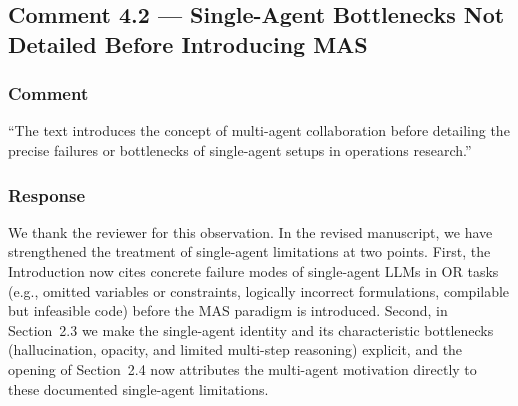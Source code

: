 \documentclass[11pt,a4paper]{article}
\begin{document}
\subsection{Comment 4.2 --- Single-Agent Bottlenecks Not Detailed Before Introducing MAS}

\subsubsection{Comment}
``The text introduces the concept of multi-agent collaboration before detailing the precise failures or bottlenecks of single-agent setups in operations research.''

\subsubsection{Response}
We thank the reviewer for this observation. In the revised manuscript, we have strengthened the treatment of single-agent limitations at two points. First, the Introduction now cites concrete failure modes of single-agent LLMs in OR tasks (e.g., omitted variables or constraints, logically incorrect formulations, compilable but infeasible code) before the MAS paradigm is introduced. Second, in Section~2.3 we make the single-agent identity and its characteristic bottlenecks (hallucination, opacity, and limited multi-step reasoning) explicit, and the opening of Section~2.4 now attributes the multi-agent motivation directly to these documented single-agent limitations.
\end{document}

